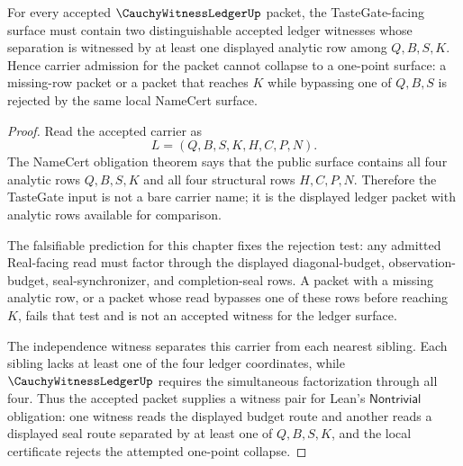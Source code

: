 \begin{theorem}
\label{thm:cauchy-witness-ledger-tastegate-nontriviality}
For every accepted $\CauchyWitnessLedgerUp$ packet, the TasteGate-facing surface must contain two distinguishable accepted ledger witnesses whose separation is witnessed by at least one displayed analytic row among $Q,B,S,K$. Hence carrier admission for the packet cannot collapse to a one-point surface: a missing-row packet or a packet that reaches $K$ while bypassing one of $Q,B,S$ is rejected by the same local NameCert surface.
\end{theorem}
\begin{proof}
Read the accepted carrier as
$$
L=(Q,B,S,K,H,C,P,N).
$$
The NameCert obligation theorem says that the public surface contains all four analytic rows $Q,B,S,K$ and all four structural rows $H,C,P,N$. Therefore the TasteGate input is not a bare carrier name; it is the displayed ledger packet with analytic rows available for comparison.

The falsifiable prediction for this chapter fixes the rejection test: any admitted Real-facing read must factor through the displayed diagonal-budget, observation-budget, seal-synchronizer, and completion-seal rows. A packet with a missing analytic row, or a packet whose read bypasses one of these rows before reaching $K$, fails that test and is not an accepted witness for the ledger surface.

The independence witness separates this carrier from each nearest sibling. Each sibling lacks at least one of the four ledger coordinates, while $\CauchyWitnessLedgerUp$ requires the simultaneous factorization through all four. Thus the accepted packet supplies a witness pair for Lean's $\mathsf{Nontrivial}$ obligation: one witness reads the displayed budget route and another reads a displayed seal route separated by at least one of $Q,B,S,K$, and the local certificate rejects the attempted one-point collapse.
\end{proof}

